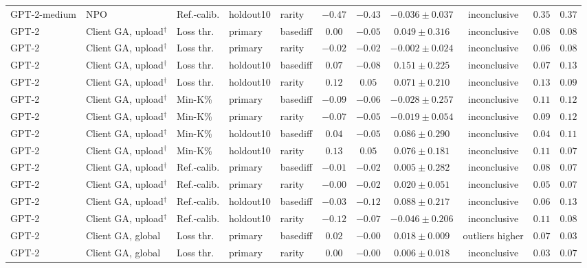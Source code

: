 \begin{table}[t]
\begin{tabular*}{\textwidth}{@{\extracolsep{\fill}}lllllcccccc@{}}
GPT-2-medium & NPO & Ref.-calib. & holdout10 & rarity & $-0.47$ & $-0.43$ & $-0.036 \pm 0.037$ & inconclusive & $0.35$ & $0.37$ \\
GPT-2 & Client GA, upload$^{\dagger}$ & Loss thr. & primary & basediff & $0.00$ & $-0.05$ & $0.049 \pm 0.316$ & inconclusive & $0.08$ & $0.08$ \\
GPT-2 & Client GA, upload$^{\dagger}$ & Loss thr. & primary & rarity & $-0.02$ & $-0.02$ & $-0.002 \pm 0.024$ & inconclusive & $0.06$ & $0.08$ \\
GPT-2 & Client GA, upload$^{\dagger}$ & Loss thr. & holdout10 & basediff & $0.07$ & $-0.08$ & $0.151 \pm 0.225$ & inconclusive & $0.07$ & $0.13$ \\
GPT-2 & Client GA, upload$^{\dagger}$ & Loss thr. & holdout10 & rarity & $0.12$ & $0.05$ & $0.071 \pm 0.210$ & inconclusive & $0.13$ & $0.09$ \\
GPT-2 & Client GA, upload$^{\dagger}$ & Min-K\% & primary & basediff & $-0.09$ & $-0.06$ & $-0.028 \pm 0.257$ & inconclusive & $0.11$ & $0.12$ \\
GPT-2 & Client GA, upload$^{\dagger}$ & Min-K\% & primary & rarity & $-0.07$ & $-0.05$ & $-0.019 \pm 0.054$ & inconclusive & $0.09$ & $0.12$ \\
GPT-2 & Client GA, upload$^{\dagger}$ & Min-K\% & holdout10 & basediff & $0.04$ & $-0.05$ & $0.086 \pm 0.290$ & inconclusive & $0.04$ & $0.11$ \\
GPT-2 & Client GA, upload$^{\dagger}$ & Min-K\% & holdout10 & rarity & $0.13$ & $0.05$ & $0.076 \pm 0.181$ & inconclusive & $0.11$ & $0.07$ \\
GPT-2 & Client GA, upload$^{\dagger}$ & Ref.-calib. & primary & basediff & $-0.01$ & $-0.02$ & $0.005 \pm 0.282$ & inconclusive & $0.08$ & $0.07$ \\
GPT-2 & Client GA, upload$^{\dagger}$ & Ref.-calib. & primary & rarity & $-0.00$ & $-0.02$ & $0.020 \pm 0.051$ & inconclusive & $0.05$ & $0.07$ \\
GPT-2 & Client GA, upload$^{\dagger}$ & Ref.-calib. & holdout10 & basediff & $-0.03$ & $-0.12$ & $0.088 \pm 0.217$ & inconclusive & $0.06$ & $0.13$ \\
GPT-2 & Client GA, upload$^{\dagger}$ & Ref.-calib. & holdout10 & rarity & $-0.12$ & $-0.07$ & $-0.046 \pm 0.206$ & inconclusive & $0.11$ & $0.08$ \\
GPT-2 & Client GA, global & Loss thr. & primary & basediff & $0.02$ & $-0.00$ & $0.018 \pm 0.009$ & outliers higher & $0.07$ & $0.03$ \\
GPT-2 & Client GA, global & Loss thr. & primary & rarity & $0.00$ & $-0.00$ & $0.006 \pm 0.018$ & inconclusive & $0.03$ & $0.07$ \\

\end{tabular*}
\end{table}
